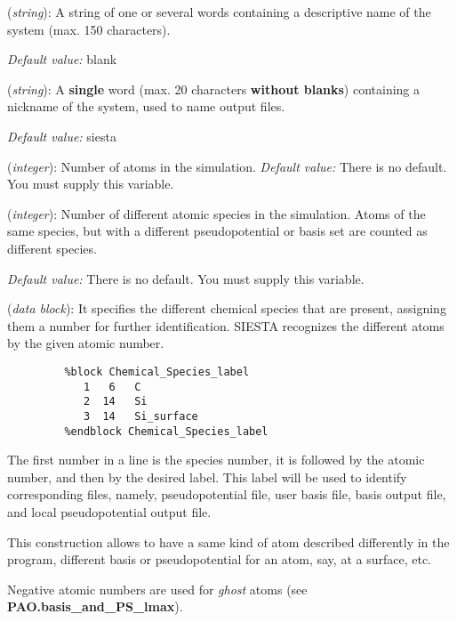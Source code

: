 \begin{description}
\itemsep 10pt
\parsep 0pt

\item[{\bf SystemName}] ({\it string}): 
A string of one or several words containing a descriptive
name of the system (max. 150 characters). 

{\it Default value:} blank

\item[{\bf SystemLabel}] ({\it string}): 
A {\bf single} word (max. 20 characters {\bf without blanks})
containing a nickname of the system, used to name output files.

{\it Default value:} siesta

\item[{\bf NumberOfAtoms}] ({\it integer}):
 Number of atoms in the simulation.
{\it Default value:} There is no default. You must supply this variable.


\item[{\bf NumberOfSpecies}] ({\it integer}):
Number of different atomic species in the simulation. 
Atoms of the same species, but with a different 
pseudopotential or basis set are counted as different species.

{\it Default value:} There is no default. You must supply this variable.


\item[{\bf ChemicalSpecieslabel}] ({\it data block}): It specifies the
different chemical species that are present, assigning them a number for
further identification. SIESTA recognizes the different atoms by the given
atomic number.

\begin{verbatim}
         %block Chemical_Species_label
            1   6   C 
            2  14   Si
            3  14   Si_surface
         %endblock Chemical_Species_label
\end{verbatim}

The first number in a line is the species number, it is followed by the
atomic number, and then by the desired label. This label will be used
to identify corresponding files, namely, pseudopotential file, user basis
file, basis output file, and local pseudopotential output file.

This construction allows to have a same kind of atom described differently
in the program, different basis or pseudopotential for an atom, say, at a
surface, etc.

Negative atomic numbers are used for {\it ghost} atoms (see
{\bf PAO.basis\_and\_PS\_lmax}).


\end{description}
